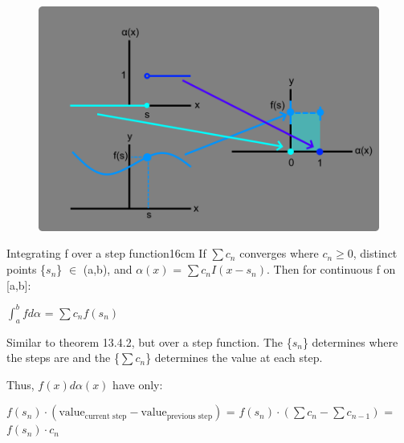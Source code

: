     \begin{figure}[h]
        \centering
        \includegraphics[scale=0.3]{Images/13.4.2.png}
    \end{figure}

    \newpage



    \begin{wtheorem}{Integrating f over a step function}{16cm}
        If $\sum c_n$ converges where $c_n \geq 0$,
        distinct points \{$s_n$\} $\in$ (a,b), and
        $\alpha(x)$ = $\sum c_n I(x-s_n)$. Then for continuous f on [a,b]:

        \hspace{0.5cm}
        $\int_a^b f d\alpha$ = $\sum c_n f(s_n)$
    \end{wtheorem}

    \begin{intuition}
        Similar to {\color{red} theorem 13.4.2}, but over a step function.
        The \{$s_n$\} determines where the steps are and the \{$\sum c_n$\}
        determines the value at each step.

        Thus, $f(x) d\alpha(x)$ have only:

        \hspace{0.5cm}
        $f(s_n) \cdot (\text{value}_{\text{current step}}
                        - \text{value}_{\text{previous step}})$
        = $f(s_n) \cdot (\sum c_n - \sum c_{n-1})$
        = $f(s_n) \cdot c_n$
    \end{intuition}

    \vspace{0.1cm}
    
